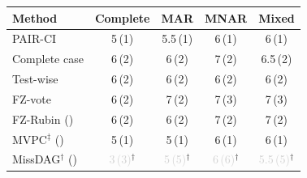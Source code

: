 \begin{tabular}{lcccc}
    \toprule
    Method & Complete & MAR & MNAR & Mixed \\
    \midrule
    PAIR-CI                                           & 5\,{\scriptsize(1)} & 5.5\,{\scriptsize(1)} & 6\,{\scriptsize(1)} & 6\,{\scriptsize(1)} \\
    Complete case                                     & 6\,{\scriptsize(2)} & 6\,{\scriptsize(2)} & 7\,{\scriptsize(2)} & 6.5\,{\scriptsize(2)} \\
    Test-wise                                         & 6\,{\scriptsize(2)} & 6\,{\scriptsize(2)} & 6\,{\scriptsize(2)} & 6\,{\scriptsize(2)} \\
    FZ-vote                                           & 6\,{\scriptsize(2)} & 7\,{\scriptsize(2)} & 7\,{\scriptsize(3)} & 7\,{\scriptsize(3)} \\
    FZ-Rubin (\citeauthor{witte2022multiple})         & 6\,{\scriptsize(2)} & 6\,{\scriptsize(2)} & 7\,{\scriptsize(2)} & 7\,{\scriptsize(2)} \\
    MVPC$^\ddagger$ (\citeauthor{tu2019causal})       & 5\,{\scriptsize(1)} & 5\,{\scriptsize(1)} & 6\,{\scriptsize(1)} & 6\,{\scriptsize(1)} \\
    MissDAG$^\dagger$ (\citeauthor{gao2022missdag})   & \textcolor{lightgray}{3\,{\scriptsize(3)}}$^\dagger$ & \textcolor{lightgray}{5\,{\scriptsize(5)}}$^\dagger$ & \textcolor{lightgray}{6\,{\scriptsize(6)}}$^\dagger$ & \textcolor{lightgray}{5.5\,{\scriptsize(5)}}$^\dagger$ \\
    \bottomrule
\end{tabular}
